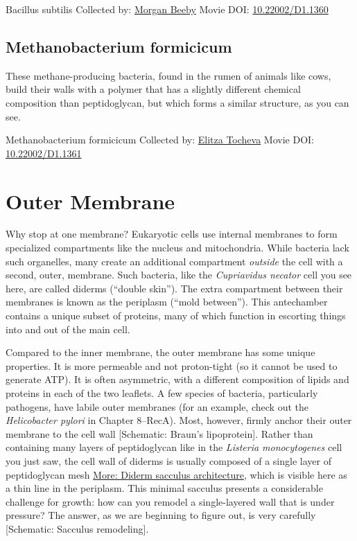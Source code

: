 \documentclass[]{tufte-book}
\begin{document}
\hypertarget{htmlwidget-533edb4bad2c583a6cc7}{}

\label{fig:2-2a}Bacillus subtilis Collected by: \protect\hyperlink{morgan_beeby}{Morgan Beeby} Movie DOI: \href{https://doi.org/10.22002/D1.1360}{10.22002/D1.1360}

\hypertarget{Methanobacterium_formicicum}{%
\subsection{Methanobacterium formicicum}\label{Methanobacterium_formicicum}}

These methane-producing bacteria, found in the rumen of animals like cows, build their walls with a polymer that has a slightly different chemical composition than peptidoglycan, but which forms a similar structure, as you can see.



\hypertarget{htmlwidget-108ddde03cd13e16c840}{}

\label{fig:2-2b}Methanobacterium formicicum Collected by: \protect\hyperlink{elitza_tocheva}{Elitza Tocheva} Movie DOI: \href{https://doi.org/10.22002/D1.1361}{10.22002/D1.1361}

\hypertarget{outer-membrane}{%
\section{Outer Membrane}\label{outer-membrane}}

Why stop at one membrane? Eukaryotic cells use internal membranes to form specialized compartments like the nucleus and mitochondria. While bacteria lack such organelles, many create an additional compartment \emph{outside} the cell with a second, outer, membrane. Such bacteria, like the \emph{Cupriavidus necator} cell you see here, are called diderms (``double skin''). The extra compartment between their membranes is known as the periplasm (``mold between''). This antechamber contains a unique subset of proteins, many of which function in escorting things into and out of the main cell.

Compared to the inner membrane, the outer membrane has some unique properties. It is more permeable and not proton-tight (so it cannot be used to generate ATP). It is often asymmetric, with a different composition of lipids and proteins in each of the two leaflets. A few species of bacteria, particularly pathogens, have labile outer membranes (for an example, check out the \emph{Helicobacter pylori} in Chapter 8--RecA). Most, however, firmly anchor their outer membrane to the cell wall {[}Schematic: Braun's lipoprotein{]}. Rather than containing many layers of peptidoglycan like in the \emph{Listeria monocytogenes} cell you just saw, the cell wall of diderms is usually composed of a single layer of peptidoglycan mesh \protect\hyperlink{Diderm_sacculus_architecture}{More: Diderm sacculus architecture}, which is visible here as a thin line in the periplasm. This minimal sacculus presents a considerable challenge for growth: how can you remodel a single-layered wall that is under pressure? The answer, as we are beginning to figure out, is very carefully {[}Schematic: Sacculus remodeling{]}.
\end{document}
